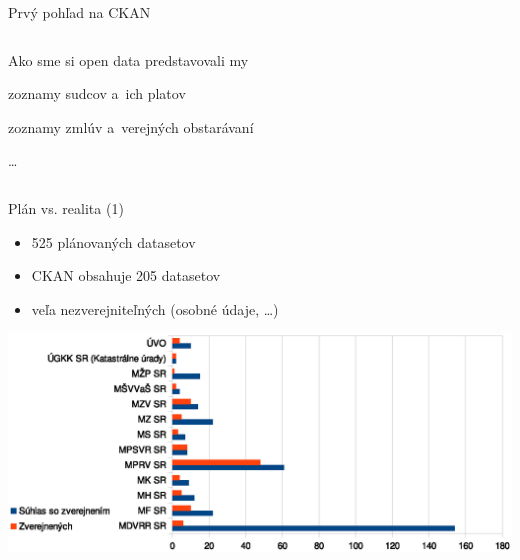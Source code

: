 \documentclass[slovak,14pt,utf8]{beamer}
\begin{document}
\begin{frame}{Prvý pohľad na CKAN}
    \begin{columns}
            \begin{block}{Ako sme si open data predstavovali my}
                \item zoznamy sudcov a~ich platov
                \item zoznamy zmlúv a~verejných obstarávaní
                \item \dots
            \end{block}
    \end{columns}
\end{frame}

\begin{frame}{Plán vs. realita (1)}
    \begin{itemize}
        \item 525 plánovaných datasetov
        \item CKAN obsahuje 205 datasetov
        \item veľa nezverejniteľných (osobné údaje, \dots)
    \end{itemize}
    \includegraphics[width=\textwidth]{zverejnene_prevadzkovatel}
\end{frame}
\end{document}
